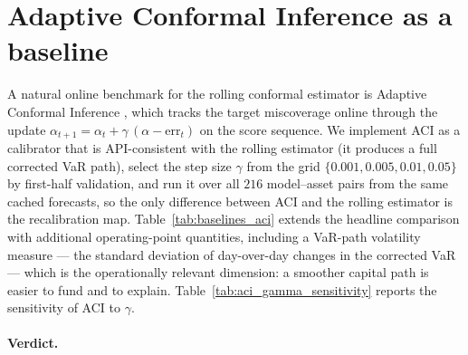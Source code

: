 \documentclass[11pt]{article}
\newcommand{\1}{\boldsymbol{1}}
\begin{document}
\section{Adaptive Conformal Inference as a baseline}
\label{sec:rr_aci}

A natural online benchmark for the rolling conformal estimator is
Adaptive Conformal Inference \citep{gibbs2021adaptive}, which tracks the target
miscoverage online through the update
$\alpha_{t+1}=\alpha_t+\gamma\,(\alpha-\mathrm{err}_t)$ on the score sequence.
We implement ACI as a calibrator that is API-consistent with the rolling
estimator (it produces a full corrected VaR path), select the step size
$\gamma$ from the grid $\{0.001,0.005,0.01,0.05\}$ by first-half validation, and
run it over all $216$ model--asset pairs from the same cached forecasts, so the
only difference between ACI and the rolling estimator is the recalibration map.
Table~\ref{tab:baselines_aci} extends the headline comparison with additional
operating-point quantities, including a VaR-path volatility measure ---
the standard deviation of day-over-day changes in the corrected VaR --- which is
the operationally relevant dimension: a smoother capital path is easier to fund
and to explain. Table~\ref{tab:aci_gamma_sensitivity} reports the sensitivity of
ACI to $\gamma$.





\paragraph{Verdict.}




\end{document}
